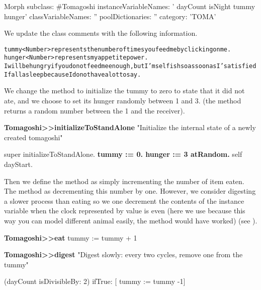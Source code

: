 \begin{classdef}\label{cls:tomaTwo}
Morph subclass: #Tomagoshi
   instanceVariableNames: ' dayCount isNight tummy hunger'
   classVariableNames: ''
   poolDictionaries: ''
   category: 'TOMA'
\end{classdef}



We update the class comments with the following information.
\begin{alltt}
tummy <Number> represents the number of times you feed me by clicking on me.
hunger <Number> represents my appetite power. 
I will be hungry if you do not feed me enough, but I'm selfish so as soon as I' satisfied I fall asleep because I do not have a lot to say. 
\end{alltt}

We change the  method to initialize the tummy to zero to state that it did not ate, and we choose to set its hunger randomly between 1 and 3. (the method  returns a random number between the 1 and the receiver). 

\begin{method}\label{mth:InitializeTwo}
\textbf{Tomagoshi>>initializeToStandAlone}
    "Initialize the internal state of a newly created tomagoshi"

   super initializeToStandAlone.
   \textbf{tummy := 0.
   hunger := 3 atRandom.}
   self dayStart.
\end{method}



Then we define the method  as simply incrementing the number of item eaten. The method  as decrementing this number by one. However, we consider digesting a slower process than eating so we one decrement the contents of the  instance variable when the clock represented by  value is even (here we use  because this way you can model different animal easily, the method  would have worked) (see ). 


\begin{method}\label{mth:eat}
\textbf{Tomagoshi>>eat}
   tummy := tummy + 1
\end{method}

\begin{method}\label{mth:digest}
\textbf{Tomagoshi>>digest}
   "Digest slowly: every two cycles, remove one from the tummy"

   (dayCount isDivisibleBy: 2)   
      ifTrue: [ tummy := tummy -1]
\end{method}

